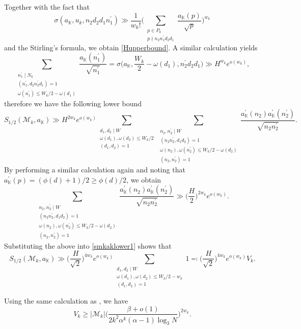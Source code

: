 \documentclass[12pt,reqno]{amsart}
\theoremstyle{definition}
\numberwithin{equation}{section}
\newcommand{\mbk}{\mathbb{K}}
\newcommand{\mcm}{\mathcal{M}}
\begin{document}
Together with the fact that 
$$
\sigma(a_\mbk, u_k, n_2 d_2 d_1 n_1^{\prime}) \gg \frac{1}{w_k!}\bigg(\sum_{\substack{p \in P_k \\ p \nmid n_2 n_1^\prime d_2 d_1}}\frac{a_\mbk(p)}{\sqrt{p}}\bigg)^{w_k}
$$
and the Stirling's formula, we obtain \eqref{Hupperbound}. A similar calculation yields 
$$
\sum_{\substack{n_1^{\prime} \mid N_k \\\left(n_1^{\prime}, d_2 n_2^{\prime} d_1\right)=1 \\ \omega(n_1^{\prime}) \leq W_k / 2-\omega(d_1)}} \frac{a_\mbk(n_1^{\prime})}{\sqrt{n_1^{\prime}}}=\sigma\Big(a_\mbk, \frac{W_k}{2}-\omega(d_1), n_2^{\prime} d_2 d_1\Big) \gg H^{w_k} e^{o(w_k)},
$$
therefore we have the following lower bound
\begin{equation}
    \label{smkaklower1}
    S_{1/2}(\mcm_k,a_\mbk) \gg H^{2w_k}e^{o(w_k)} \sum_{\substack{d_1,d_2 \mid W \\ \omega(d_1),\omega(d_2) \le W_k/2 \\ (d_1,d_2)=1}} \sum_{\substack{n_2,n_2^\prime \mid W \\ (n_2n_2^\prime,d_1d_2)=1 \\ \omega(n_2),\omega(n_2^\prime)\le W_k/2-\omega(d_2)\\(n_2,n_2^\prime)=1}} \frac{a_\mbk^\prime(n_2)a_\mbk^\prime(n_2^\prime)}{\sqrt{n_2n_2^\prime}}.
\end{equation}
By performing a similar calculation again and noting that $a_\mbk^\prime(p) = (\phi(d)+1)/2 \ge \phi(d)/2$, we obtain 
$$
\sum_{\substack{n_2,n_2^\prime \mid W \\ (n_2n_2^\prime,d_1d_2)=1 \\ \omega(n_2),\omega(n_2^\prime)\le W_k/2-\omega(d_2)\\(n_2,n_2^\prime)=1}} \frac{a_\mbk^\prime(n_2)a_\mbk^\prime(n_2^\prime)}{\sqrt{n_2n_2^\prime}} \gg \Big(\frac{H}{2} \Big)^{2w_k}e^{o(w_k)}.
$$
Substituting the above into \eqref{smkaklower1} shows that
\begin{equation}
    \label{smkaklower2}
    S_{1/2}(\mcm_k,a_\mbk) \gg \Big(\frac{H}{\sqrt{2}} \Big)^{4w_k}e^{o(w_k)} \sum_{\substack{d_1,d_2 \mid W \\ \omega(d_1),\omega(d_2) \le W_k/2-w_k \\ (d_1,d_2)=1}} 1 \eqqcolon \Big(\frac{H}{\sqrt{2}} \Big)^{4w_k}e^{o(w_k)}V_k.
\end{equation}
\par
Using the same calculation as \cite[Eq. (2.13)]{tenen2019galsum}, we have
$$
V_k \ge |\mcm_k|\Big(\frac{\beta+o(1)}{2k^2 \alpha^k(\alpha-1)\log_3 N} \Big)^{2w_k}.
$$
\end{document}
